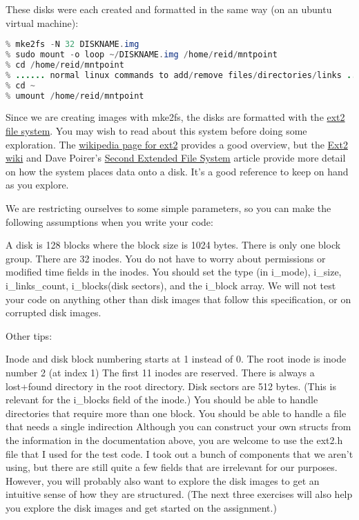 \documentclass[12pt]{article}
\begin{document}
\bigskip

These disks were each created and formatted in the same way (on an ubuntu virtual machine):

\bigskip

\begin{lstlisting}[language=Java,caption={lesson\_01/Prompter.java}]
% dd if=/dev/zero of=~/DISKNAME.img bs=1024 count=128
% mke2fs -N 32 DISKNAME.img
% sudo mount -o loop ~/DISKNAME.img /home/reid/mntpoint
% cd /home/reid/mntpoint
% ...... normal linux commands to add/remove files/directories/links .....
% cd ~
% umount /home/reid/mntpoint
\end{lstlisting}

\bigskip

Since we are creating images with mke2fs, the disks are formatted with the \href{https://en.wikipedia.org/wiki/Ext2}{ext2
file system}. You may wish to read about this system before doing some exploration.
The \href{http://en.wikipedia.org/wiki/Ext2}{wikipedia page for ext2} provides a
good overview, but the \href{http://wiki.osdev.org/Ext2}{Ext2 wiki} and Dave
Poirer's \href{http://www.nongnu.org/ext2-doc/index.html}{Second Extended File System}
article provide more detail on how the system places data onto a disk. It's a good
reference to keep on hand as you explore.

\bigskip

We are restricting ourselves to some simple parameters, so you can make the
following assumptions when you write your code:

\bigskip

A disk is 128 blocks where the block size is 1024 bytes.
There is only one block group.
There are 32 inodes.
You do not have to worry about permissions or modified time fields in the inodes. You should set the type (in i_mode), i_size, i_links_count, i_blocks(disk sectors), and the i_block array.
We will not test your code on anything other than disk images that follow this specification, or on corrupted disk images.

Other tips:

Inode and disk block numbering starts at 1 instead of 0.
The root inode is inode number 2 (at index 1)
The first 11 inodes are reserved.
There is always a lost+found directory in the root directory.
Disk sectors are 512 bytes. (This is relevant for the i_blocks field of the inode.)
You should be able to handle directories that require more than one block.
You should be able to handle a file that needs a single indirection
Although you can construct your own structs from the information in the documentation above, you are welcome to use the ext2.h file that I used for the test code. I took out a bunch of components that we aren't using, but there are still quite a few fields that are irrelevant for our purposes.
However, you will probably also want to explore the disk images to get an intuitive sense of how they are structured. (The next three exercises will also help you explore the disk images and get started on the assignment.)
\end{document}
